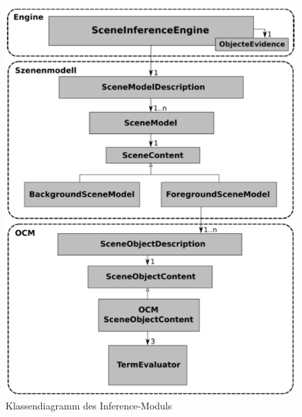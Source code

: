 \begin{deprecated}
\cite{gehrung14}
\end{deprecated}
\begin{figure}
	\centering
	\includegraphics[width=15cm]{bilder/InferenceClass.pdf}
	\caption{Klassendiagramm des Inference-Moduls}
	\label{img:inferenceclass}
\end{figure}


